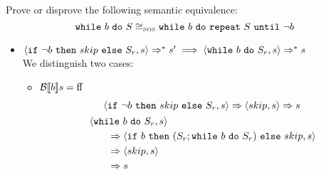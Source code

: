 \begin{exercise}{
    Prove or disprove the following semantic equivalence:
    \[ \texttt{while}\ b\ \texttt{do}\ S \cong_{\text{\tiny SOS}} \texttt{while}\ b\ \texttt{do}\ \texttt{repeat}\ S\ \texttt{until}\ \neg b  \]\vspace*{-0.6cm}
}
\begin{itemize}
\begin{itemize}
\begin{itemize}
                    \begin{gather*}
                        k_1 + k_2 = k - 1 \\
                        \instr{S}{s} \Rightarrow^{k_1} s'' \\
                        \instr{\wif{\neg b}{skip}{S_r}}{s''} \Rightarrow^{k_2} s'
                    \end{gather*}
                    Then
                    \begin{align*}
                        &\instr{\wwhile{b}{S}}{s}
                        \\&\qquad\Rightarrow \instr{\wif{b}{(S; \wwhile{b}{S})}{skip}}{s}
                        \\&\qquad\Rightarrow \instr{S; \wwhile{b}{S}}{s}
                        \\&\text{By the composition lemma}
                        \\&\qquad\Rightarrow \instr{\wwhile{b}{S}}{s''}
                    \end{align*}
                    And since $\instr{\wif{\neg b}{skip}{S_r}}{s''} \Rightarrow^{k_2} s'$ and $k_2 = k - 1 - k_1 \leq k$  we can apply the inductive hypothesis and get
                    \[ \instr{\wwhile{b}{S}}{s''} \Rightarrow s' \]
                \end{itemize}
            \end{itemize}
        \item $\left<\texttt{if}\ \neg b\ \texttt{then}\ skip\ \texttt{else}\ S_r, s\right> \Rightarrow^* s' \implies \left<\texttt{while}\ b\ \texttt{do}\ S_r, s\right> \Rightarrow^* s$ \\
            We distinguish two cases:
            \begin{itemize}
                \item $\mathcal{B} \llbracket  b \rrbracket s = \text{ff}$
                \begin{gather*}
                    \instr{\wif{\neg b}{skip}{S_r}}{s}
                    \Rightarrow
                    \instr{skip}{s}
                    \Rightarrow s
                    \\
                    \begin{align*}
                        &\instr{\wwhile{b}{S}_r}{s}
                        \\&\qquad\Rightarrow \instr{\wif{b}{(S_r; \wwhile{b}{S_r})}{skip}}{s}
                        \\&\qquad\Rightarrow \instr{skip}{s}
                        \\&\qquad\Rightarrow s

\end{align*}
\end{gather*}
\end{itemize}
\end{itemize}
\end{exercise}
